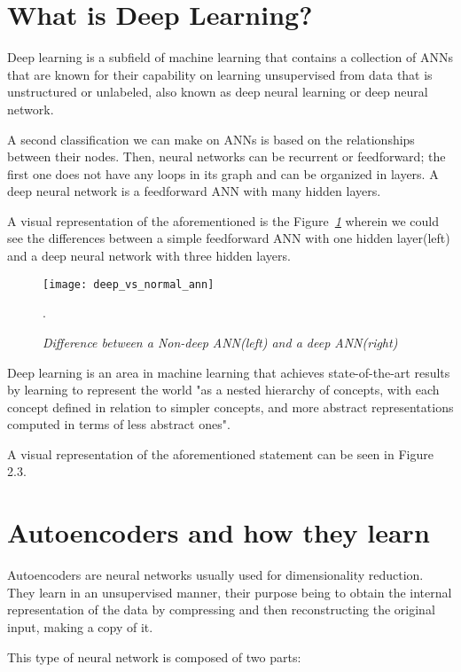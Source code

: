 \section{What is Deep Learning?}

Deep learning is a subfield of machine learning that contains a collection of ANNs that are known for
their capability on learning unsupervised from data that is unstructured or unlabeled,
also known as deep neural learning or deep neural network.

A second classification we can make on ANNs is based on the relationships between their nodes.
Then, neural networks can be recurrent or feedforward;
the first one does not have any loops in its graph and can be organized in layers.
A deep neural network is a feedforward ANN with many hidden layers.

A visual representation of the aforementioned is the Figure\emph{~\ref{fig:deep_vs_normal}}
wherein we could see the differences between a simple feedforward ANN with one
hidden layer(left) and a deep neural network with three hidden layers.
\begin{figure}[h]
    \centering
    \texttt{[image: deep\_vs\_normal\_ann]}
    \caption{\emph{Difference between a Non-deep ANN(left) and a deep ANN(right) \cite{deepLearningBook}}}.
    \label{fig:deep_vs_normal}
\end{figure}

Deep learning is an area in machine learning that achieves state-of-the-art
results by learning to represent the world "as a nested hierarchy of concepts,
with each concept defined in relation to simpler concepts,
and more abstract representations computed in terms of less abstract ones".\cite{Goodfellow-et-al-2016}

A visual representation of the aforementioned statement can be seen in Figure 2.3.



\section{Autoencoders and how they learn}

Autoencoders are neural networks usually used for dimensionality reduction.
They learn in an unsupervised manner,
their purpose being to obtain the internal representation of
the data by compressing and then reconstructing the original input,
making a copy of it.\cite{deepLearningBook}

This type of neural network is composed of two parts:

